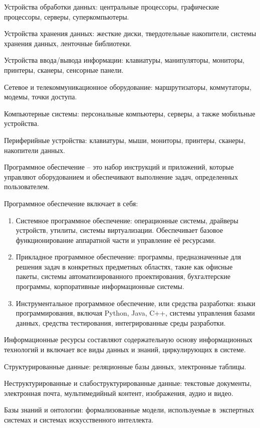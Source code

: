 \documentclass{ou}
\begin{document}
Устройства обработки данных: центральные процессоры, графические процессоры, серверы, суперкомпьютеры.

Устройства хранения данных: жесткие диски, твердотельные накопители, системы хранения данных, ленточные библиотеки.

Устройства ввода/вывода информации: клавиатуры, манипуляторы, мониторы, принтеры, сканеры, сенсорные панели.

Сетевое и телекоммуникационное оборудование: маршрутизаторы, коммутаторы, модемы, точки доступа.

Компьютерные системы: персональные компьютеры, серверы, а также мобильные устройства.

Периферийные устройства: клавиатуры, мыши, мониторы, принтеры, сканеры, накопители данных.

Программное обеспечение -- это набор инструкций и приложений, которые управляют оборудованием и обеспечивают выполнение задач, определенных пользователем.

Программное обеспечение включает в себя:
\begin{enumerate}[itemindent=4em, nosep, label=\arabic*)]
\item Системное программное обеспечение: операционные системы, драйверы устройств, утилиты, системы виртуализации. Обеспечивает базовое функционирование аппаратной части и управление её ресурсами.
\item Прикладное программное обеспечение: программы, предназначенные для решения задач в конкретных предметных областях, такие как офисные пакеты, системы автоматизированного проектирования, бухгалтерские программы, корпоративные информационные системы.
\item Инструментальное программное обеспечение, или средства разработки: языки программирования, включая Python, Java, C++, системы управления базами данных, средства тестирования, интегрированные среды разработки.
\end{enumerate}

Информационные ресурсы составляют содержательную основу информационных технологий и включает все виды данных и знаний, циркулирующих в системе.

Структурированные данные: реляционные базы данных, электронные таблицы.

Неструктурированные и слабоструктурированные данные: текстовые документы, электронная почта, мультимедийный контент, изображения, аудио и видео.

Базы знаний и онтологии: формализованные модели, используемые в~экспертных системах и системах искусственного интеллекта.
\end{document}
